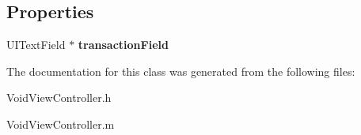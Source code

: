 \subsection*{Properties}
\begin{DoxyCompactItemize}
\item 
\hypertarget{interface_void_view_controller_aaa34395e57e9bc1b1ca1fd961fa8c2e9}{
UITextField $\ast$ {\bfseries transactionField}}
\label{interface_void_view_controller_aaa34395e57e9bc1b1ca1fd961fa8c2e9}

\end{DoxyCompactItemize}


The documentation for this class was generated from the following files:\begin{DoxyCompactItemize}
\item 
VoidViewController.h\item 
VoidViewController.m\end{DoxyCompactItemize}
